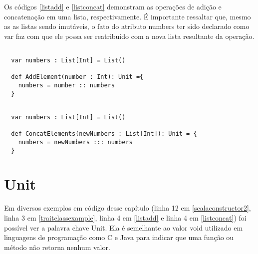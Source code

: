 Os códigos \ref{listadd} e \ref{listconcat} demonstram 
as operações de adição e concatenação em uma lista, 
respectivamente. É importante ressaltar que, mesmo 
as as listas sendo imutáveis, o fato do 
atributo numbers ter sido declarado como var 
faz com que ele possa ser reatribuído com a nova lista 
resultante da operação.

\begin{lstlisting}[caption={Exemplo de adição em uma lista imutável},label=listadd]

  var numbers : List[Int] = List()
  
  def AddElement(number : Int): Unit ={
    numbers = number :: numbers
  }

\end{lstlisting}

\begin{lstlisting}[caption={Exemplo de concatenação em uma lista imutável},label=listconcat]

  var numbers : List[Int] = List()
  
  def ConcatElements(newNumbers : List[Int]): Unit = {
    numbers = newNumbers ::: numbers
  }    

\end{lstlisting}

\section{Unit}

Em diversos exemplos em código desse capítulo 
(linha 12 em \ref{scalaconstructor2}, linha 3 em 
\ref{traitclassexample}, linha 4 em 
\ref{listadd} e linha 4 em \ref{listconcat}) 
foi possível ver a palavra chave Unit. Ela é semelhante ao 
valor void utilizado em linguagens de programação como C e 
Java para indicar que uma função ou método não retorna 
nenhum valor\cite{wampler2021}.